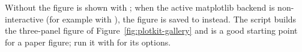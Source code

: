 Without  the figure is shown with ; when the
active matplotlib backend is non-interactive (for example with
), the figure is saved to 
instead. The script  builds the
three-panel figure of Figure~\ref{fig:plotkit-gallery} and is a good starting
point for a paper figure; run it with  for its options.

\par\endgroup
